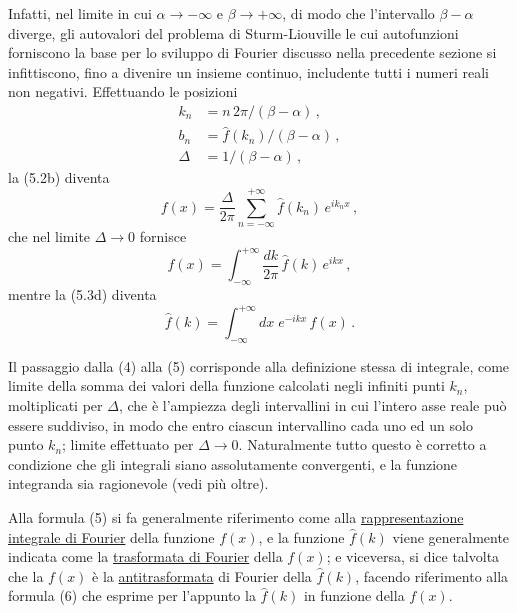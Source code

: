 \documentclass[11pt, a4paper]{book}
\numberwithin{equation}{section}
\begin{document}
Infatti, nel limite in cui $\alpha\to-\infty$ e $\beta\to+\infty$, di modo che l'intervallo $\beta-\alpha$ diverge, gli autovalori del problema di Sturm-Liouville le cui autofunzioni forniscono la base per lo sviluppo di Fourier discusso nella precedente sezione si infittiscono, fino a divenire un insieme continuo, includente tutti i numeri reali non negativi. Effettuando le posizioni
\begin{align}
  k_n &= n\,2\pi/(\beta-\alpha)\,, \tag{1}\\
  b_n &= \hat{f}(k_n)/(\beta-\alpha)\,, \tag{2}\\
  \Delta &= 1/(\beta-\alpha)\,, \tag{3}
\end{align}
la (5.2b) diventa
\begin{equation}
  f(x) = \frac{\Delta}{2\pi}\sum_{n=-\infty}^{+\infty}\hat{f}(k_n)\,e^{ik_n x}\,, \tag{4}
\end{equation}
che nel limite $\Delta\to0$ fornisce
\begin{equation}
  f(x) = \int_{-\infty}^{+\infty}\frac{dk}{2\pi}\,\hat{f}(k)\,e^{ikx}\,, \tag{5}
\end{equation}
mentre la (5.3d) diventa
\begin{equation}
  \hat{f}(k) = \int_{-\infty}^{+\infty} dx\;e^{-ikx}\,f(x)\,. \tag{6}
\end{equation}

Il passaggio dalla (4) alla (5) corrisponde alla definizione stessa di integrale, come limite della somma dei valori della funzione calcolati negli infiniti punti $k_n$, moltiplicati per $\Delta$, che è l'ampiezza degli intervallini in cui l'intero asse reale può essere suddiviso, in modo che entro ciascun intervallino cada uno ed un solo punto $k_n$; limite effettuato per $\Delta\to0$. Naturalmente tutto questo è corretto a condizione che gli integrali siano assolutamente convergenti, e la funzione integranda sia ragionevole (vedi più oltre).

Alla formula (5) si fa generalmente riferimento come alla \underline{rappresentazione integrale di Fourier} della funzione $f(x)$, e la funzione $\hat{f}(k)$ viene generalmente indicata come la \underline{trasformata di Fourier} della $f(x)$; e viceversa, si dice talvolta che la $f(x)$ è la \underline{antitrasformata} di Fourier della $\hat{f}(k)$, facendo riferimento alla formula (6) che esprime per l'appunto la $\hat{f}(k)$ in funzione della $f(x)$.
\end{document}
